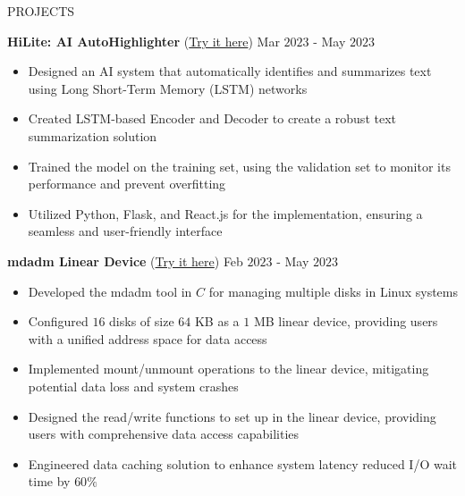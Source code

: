 \documentclass{resume} %
\begin{document}
\begin{rSection}{PROJECTS}

{\bf HiLite: AI AutoHighlighter }{(\href{https://github.com/harshitjain17/HiLite-AIAutoHighlighter}{Try it here})} \hfill Mar $2023$ - May $2023$
\begin{itemize}[itemsep = -4pt]
    \item Designed an AI system that automatically identifies and summarizes text using Long Short-Term Memory (LSTM) networks
    \item Created LSTM-based Encoder and Decoder to create a robust text summarization solution
    \item Trained the model on the training set, using the validation set to monitor its performance and prevent overfitting
    \item Utilized Python, Flask, and React.js for the implementation, ensuring a seamless and user-friendly interface
\end{itemize}

{\bf mdadm Linear Device }{(\href{https://github.com/harshitjain17/mdadm-Linear-Device}{Try it here})} \hfill Feb $2023$ - May $2023$
\begin{itemize}[itemsep = -4pt]
    \item Developed the mdadm tool in $C$ for managing multiple disks in Linux systems
    \item Configured $16$ disks of size $64$ KB as a $1$ MB linear device, providing users with a unified address space for data access
    \item Implemented mount/unmount operations to the linear device, mitigating potential data loss and system crashes
    \item Designed the read/write functions to set up in the linear device, providing users with comprehensive data access capabilities
    \item Engineered data caching solution to enhance system latency reduced I/O wait time by $60\%$
\end{itemize}


\end{rSection}
\end{document}
